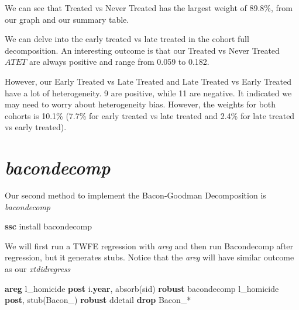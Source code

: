 \documentclass[
]{book}
\newenvironment{Shaded}{\begin{snugshade}}{\end{snugshade}}
\newcommand{\FunctionTok}[1]{\textcolor[rgb]{0.13,0.29,0.53}{\textbf{#1}}}
\newcommand{\KeywordTok}[1]{\textcolor[rgb]{0.13,0.29,0.53}{\textbf{#1}}}
\newcommand{\NormalTok}[1]{#1}
\begin{document}
We can see that Treated vs Never Treated has the largest weight of 89.8\%, from our graph and our summary table.

We can delve into the early treated vs late treated in the cohort full decomposition. An interesting outcome is that our Treated vs Never Treated \(ATET\) are always positive and range from 0.059 to 0.182.

However, our Early Treated vs Late Treated and Late Treated vs Early Treated have a lot of heterogeneity. 9 are positive, while 11 are negative. It indicated we may need to worry about heterogeneity bias. However, the weights for both cohorts is 10.1\% (7.7\% for early treated vs late treated and 2.4\% for late treated vs early treated).

\section{\texorpdfstring{\emph{bacondecomp}}{bacondecomp}}\label{bacondecomp}

Our second method to implement the Bacon-Goodman Decomposition is \emph{bacondecomp}

\begin{Shaded}
\begin{Highlighting}[]
\KeywordTok{ssc}\NormalTok{ install bacondecomp}
\end{Highlighting}
\end{Shaded}

We will first run a TWFE regression with \emph{areg} and then run Bacondecomp after regression, but it generates stubs. Notice that the \emph{areg} will have similar outcome as our \emph{xtdidregress}

\begin{Shaded}
\begin{Highlighting}[]
\KeywordTok{areg}\NormalTok{ l\_homicide }\KeywordTok{post}\NormalTok{ i.}\FunctionTok{year}\NormalTok{, absorb(sid) }\KeywordTok{robust}
\NormalTok{bacondecomp l\_homicide }\KeywordTok{post}\NormalTok{, stub(Bacon\_) }\KeywordTok{robust}\NormalTok{ ddetail}
\KeywordTok{drop}\NormalTok{ Bacon\_*}
\end{Highlighting}
\end{Shaded}
\end{document}
